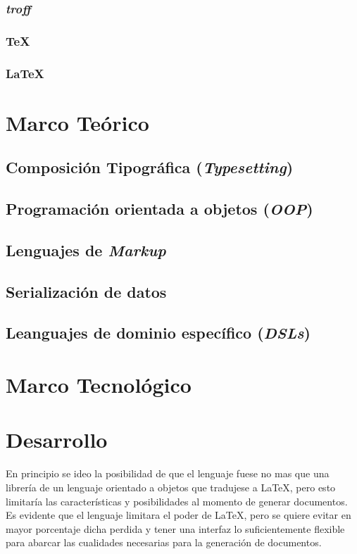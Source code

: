 \documentclass[12pt,letterpaper,titlepage,oneside,openright]{book}
\newcommand{\OhTeX}{%
    \makebox[0.76em][c]{O}%
    \makebox[0.25em][c]{%
        \raisebox{0.14em}[0em][0em]{%
            \fontsize{0.5em}{0cm}%
                \selectfont H%
        }%
    }%
    \makebox[1.35em][c]{\TeX}%
}
\newcommand{\latex}{\LaTeX\xspace}
\newcommand{\ohtex}{\OhTeX\xspace}
\begin{document}
\subsection{\textit{troff}}
\lipsum[1-2]
\subsection{\TeX}
\lipsum[1-2]
\subsection{\LaTeX}
\lipsum[1-2]
\subsection[OhTeX]{\ohtex}
\lipsum[1-2]

\chapter{Marco Teórico}
\lipsum[1-2]
\section{Composición Tipográfica (\textit{Typesetting})}
\section{Programación orientada a objetos (\textit{OOP})}
\section{Lenguajes de \textit{Markup}}
\section{Serialización de datos}
\section{Leanguajes de dominio específico (\textit{DSLs})}

\chapter{Marco Tecnológico}
\lipsum[1-2]

\chapter{Desarrollo}
En principio se ideo la posibilidad de que el lenguaje fuese no mas que una
librería de un lenguaje orientado a objetos que tradujese a \latex, pero esto
limitaría las características y posibilidades al momento de generar documentos.
Es evidente que el lenguaje limitara el poder de \latex, pero se quiere evitar
en mayor porcentaje dicha perdida y tener una interfaz lo suficientemente
flexible para abarcar las cualidades necesarias para la generación de documentos.
\end{document}
